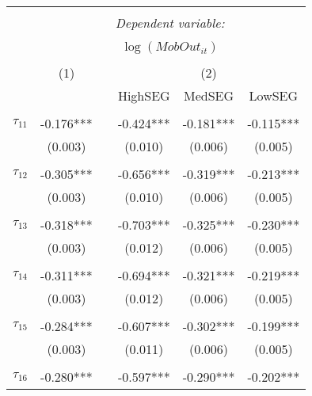\begin{tabular}{@{\extracolsep{-5pt}}lccccc} 
\\[-1.8ex]\hline 
\hline \\[-1.8ex] 
 & \multicolumn{5}{c}{\textit{Dependent variable:}} \\ 
\cline{2-6} 
\\[-1.8ex] & \multicolumn{5}{c}{$\log(MobOut_{it})$}\\ 
\\[-1.8ex] & (1) && \multicolumn{3}{c}{(2)} \\ 
\cline{2-2}\cline{4-6}
        &&& HighSEG & MedSEG & LowSEG  \\
 \\[-1.8ex] 
$\tau_{11}$     & -0.176*** && -0.424*** & -0.181*** & -0.115*** \\
                &  (0.003)  &&  (0.010)  &  (0.006)  &  (0.005)  \\
                &           &&           &           &           \\[-2.1ex]
$\tau_{12}$     & -0.305*** && -0.656*** & -0.319*** & -0.213*** \\
                &  (0.003)  &&  (0.010)  &  (0.006)  &  (0.005)  \\
                &           &&           &           &           \\[-2.1ex]
$\tau_{13}$     & -0.318*** && -0.703*** & -0.325*** & -0.230*** \\
                &  (0.003)  &&  (0.012)  &  (0.006)  &  (0.005)  \\
                &           &&           &           &           \\[-2.1ex]
$\tau_{14}$     & -0.311*** && -0.694*** & -0.321*** & -0.219*** \\
                &  (0.003)  &&  (0.012)  &  (0.006)  &  (0.005)  \\
                &           &&           &           &           \\[-2.1ex]
$\tau_{15}$     & -0.284*** && -0.607*** & -0.302*** & -0.199*** \\
                &  (0.003)  &&  (0.011)  &  (0.006)  &  (0.005)  \\
                &           &&           &           &           \\[-2.1ex]
$\tau_{16}$     & -0.280*** && -0.597*** & -0.290*** & -0.202*** \\

\end{tabular}
